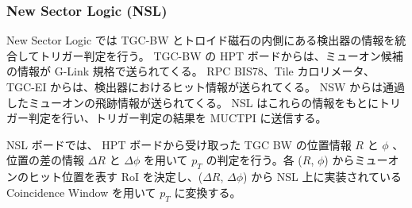 \subsubsection{New Sector Logic (NSL)}
New Sector Logic では TGC-BW とトロイド磁石の内側にある検出器の情報を統合してトリガー判定を行う。
TGC-BW の HPT ボードからは、ミューオン候補の情報が G-Link 規格で送られてくる。
RPC BIS78、Tile カロリメータ、 TGC-EI からは、検出器におけるヒット情報が送られてくる。
NSW からは通過したミューオンの飛跡情報が送られてくる。
NSL はこれらの情報をもとにトリガー判定を行い、トリガー判定の結果を MUCTPI に送信する。

NSL ボードでは、 HPT ボードから受け取った TGC BW の位置情報 $R$ と $\phi$ 、位置の差の情報 $\Delta R$ と $\Delta \phi$ を用いて $p_T$ の判定を行う。各 ($R$, $\phi$) からミューオンのヒット位置を表す RoI を決定し、($\Delta R$, $\Delta \phi$) から NSL 上に実装されている Coincidence Window を用いて $p_T$ に変換する。
